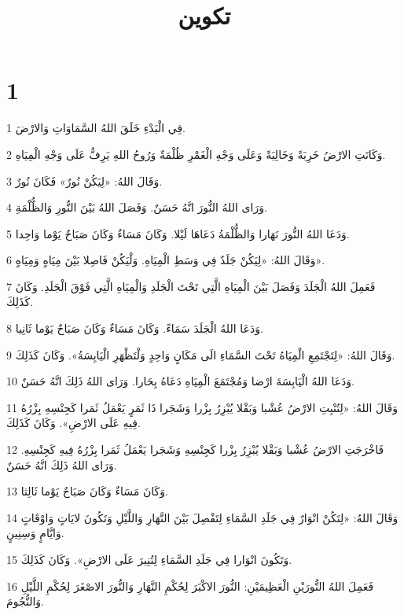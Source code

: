 

\title{تكوين}


\chapter{1}

\par 1 فِي الْبَدْءِ خَلَقَ اللهُ السَّمَاوَاتِ وَالارْضَ.
\par 2 وَكَانَتِ الارْضُ خَرِبَةً وَخَالِيَةً وَعَلَى وَجْهِ الْغَمْرِ ظُلْمَةٌ وَرُوحُ اللهِ يَرِفُّ عَلَى وَجْهِ الْمِيَاهِ.
\par 3 وَقَالَ اللهُ: «لِيَكُنْ نُورٌ» فَكَانَ نُورٌ.
\par 4 وَرَاى اللهُ النُّورَ انَّهُ حَسَنٌ. وَفَصَلَ اللهُ بَيْنَ النُّورِ وَالظُّلْمَةِ.
\par 5 وَدَعَا اللهُ النُّورَ نَهَارا وَالظُّلْمَةُ دَعَاهَا لَيْلا. وَكَانَ مَسَاءٌ وَكَانَ صَبَاحٌ يَوْما وَاحِدا.
\par 6 وَقَالَ اللهُ: «لِيَكُنْ جَلَدٌ فِي وَسَطِ الْمِيَاهِ. وَلْيَكُنْ فَاصِلا بَيْنَ مِيَاهٍ وَمِيَاهٍ».
\par 7 فَعَمِلَ اللهُ الْجَلَدَ وَفَصَلَ بَيْنَ الْمِيَاهِ الَّتِي تَحْتَ الْجَلَدِ وَالْمِيَاهِ الَّتِي فَوْقَ الْجَلَدِ. وَكَانَ كَذَلِكَ.
\par 8 وَدَعَا اللهُ الْجَلَدَ سَمَاءً. وَكَانَ مَسَاءٌ وَكَانَ صَبَاحٌ يَوْما ثَانِيا.
\par 9 وَقَالَ اللهُ: «لِتَجْتَمِعِ الْمِيَاهُ تَحْتَ السَّمَاءِ الَى مَكَانٍ وَاحِدٍ وَلْتَظْهَرِ الْيَابِسَةُ». وَكَانَ كَذَلِكَ.
\par 10 وَدَعَا اللهُ الْيَابِسَةَ ارْضا وَمُجْتَمَعَ الْمِيَاهِ دَعَاهُ بِحَارا. وَرَاى اللهُ ذَلِكَ انَّهُ حَسَنٌ.
\par 11 وَقَالَ اللهُ: «لِتُنْبِتِ الارْضُ عُشْبا وَبَقْلا يُبْزِرُ بِزْرا وَشَجَرا ذَا ثَمَرٍ يَعْمَلُ ثَمَرا كَجِنْسِهِ بِزْرُهُ فِيهِ عَلَى الارْضِ». وَكَانَ كَذَلِكَ.
\par 12 فَاخْرَجَتِ الارْضُ عُشْبا وَبَقْلا يُبْزِرُ بِزْرا كَجِنْسِهِ وَشَجَرا يَعْمَلُ ثَمَرا بِزْرُهُ فِيهِ كَجِنْسِهِ. وَرَاى اللهُ ذَلِكَ انَّهُ حَسَنٌ.
\par 13 وَكَانَ مَسَاءٌ وَكَانَ صَبَاحٌ يَوْما ثَالِثا.
\par 14 وَقَالَ اللهُ: «لِتَكُنْ انْوَارٌ فِي جَلَدِ السَّمَاءِ لِتَفْصِلَ بَيْنَ النَّهَارِ وَاللَّيْلِ وَتَكُونَ لايَاتٍ وَاوْقَاتٍ وَايَّامٍ وَسِنِينٍ.
\par 15 وَتَكُونَ انْوَارا فِي جَلَدِ السَّمَاءِ لِتُنِيرَ عَلَى الارْضِ». وَكَانَ كَذَلِكَ.
\par 16 فَعَمِلَ اللهُ النُّورَيْنِ الْعَظِيمَيْنِ: النُّورَ الاكْبَرَ لِحُكْمِ النَّهَارِ وَالنُّورَ الاصْغَرَ لِحُكْمِ اللَّيْلِ وَالنُّجُومَ.
